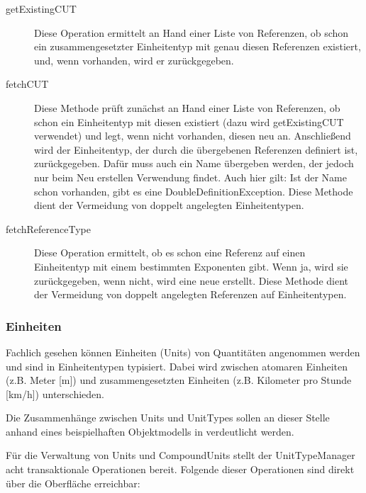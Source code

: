 \begin{description}
\item[getExistingCUT]
Diese Operation ermittelt an Hand einer Liste von Referenzen, ob schon ein zusammengesetzter Einheitentyp mit genau diesen Referenzen existiert, und, wenn vorhanden, wird er zurückgegeben. 
\item[fetchCUT]
Diese Methode prüft zunächst an Hand einer Liste von Referenzen, ob schon ein Einheitentyp mit diesen existiert (dazu wird getExistingCUT verwendet) und legt, wenn nicht vorhanden, diesen neu an. Anschließend wird der Einheitentyp, der durch die übergebenen Referenzen definiert ist, zurückgegeben. Dafür muss auch ein Name übergeben werden, der jedoch nur beim Neu erstellen Verwendung findet. Auch hier gilt: Ist der Name schon vorhanden, gibt es eine DoubleDefinitionException. Diese Methode dient der Vermeidung von doppelt angelegten Einheitentypen.
\item[fetchReferenceType]
Diese Operation ermittelt, ob es schon eine Referenz auf einen Einheitentyp mit einem bestimmten Exponenten gibt. Wenn ja, wird sie zurückgegeben, wenn nicht, wird eine neue erstellt. Diese Methode dient der Vermeidung von doppelt angelegten Referenzen auf Einheitentypen.
\end{description}


\subsubsection{Einheiten}
Fachlich gesehen können Einheiten (Units) von Quantitäten angenommen werden und sind in Einheitentypen typisiert.
Dabei wird zwischen atomaren Einheiten (z.B. Meter [m]) und zusammengesetzten Einheiten (z.B. Kilometer pro Stunde [km/h]) unterschieden.


Die Zusammenhänge zwischen Units und UnitTypes sollen an dieser Stelle anhand eines beispielhaften Objektmodells in  verdeutlicht werden.



Für die Verwaltung von Units und CompoundUnits stellt der UnitTypeManager acht transaktionale Operationen bereit.
Folgende dieser Operationen sind direkt über die Oberfläche erreichbar:

